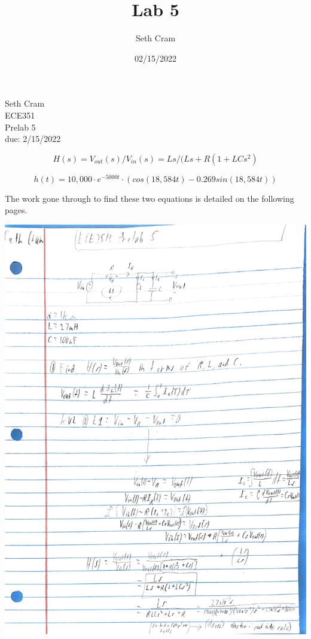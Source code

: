 \documentclass[12pt]{report}
\title{Lab 5}		%
\author{ Seth Cram}
\date{02/15/2022}
\begin{document}




\renewcommand{\thesection}{\arabic{section}}

Seth Cram \\
ECE351 \\
Prelab 5\\ 
due: 2/15/2022
 
    \begin{equation*}
        H(s) = V_{out}(s)/V_{in}(s) = Ls/(Ls + R(1 + LCs^2)
    \end{equation*}
    
    \begin{equation*}
        h(t) = 10,000 \cdot e^{-5000t} \cdot ( cos(18,584t) - 0.269sin(18,584t) )
    \end{equation*}

    The work gone through to find these two equations is detailed on the following pages.

    \includegraphics[scale = 0.15]{EB56ECFA-E791-46BE-ACBF-A6EA65DBC192.jpeg}
\end{document}
